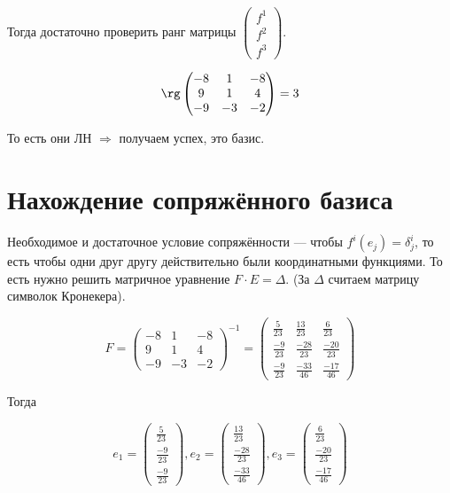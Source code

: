 \documentclass[12pt, a4paper]{article}
\begin{document}
Тогда достаточно проверить ранг матрицы $\begin{pmatrix} f^1 \\ f^2 \\ f^3 \end{pmatrix}$.

\begin{equation}
    \rg \left(\begin{matrix}
        -8 & 1 & -8 \\
        9 & 1 & 4 \\
        -9 & -3 & -2
    \end{matrix}\right) = 3
\end{equation}

То есть они ЛН $\Rightarrow$ получаем успех, это базис.

\section{Нахождение сопряжённого базиса}

Необходимое и достаточное условие сопряжённости — чтобы $f^i(e_j) = \delta^i_j$, то есть чтобы одни друг другу действительно были координатными функциями.
То есть нужно решить матричное уравнение $F \cdot E = \Delta$. (За $\Delta$ считаем матрицу символок Кронекера).

\begin{equation}
    F = \left(\begin{matrix}
        -8 & 1 & -8 \\
        9 & 1 & 4 \\
        -9 & -3 & -2
    \end{matrix}\right)^{-1} = \left(\begin{matrix}
        \frac{5}{23} & \frac{13}{23} & \frac{6}{23} \\
        \frac{-9}{23} & \frac{-28}{23} & \frac{-20}{23} \\
        \frac{-9}{23} & \frac{-33}{46} & \frac{-17}{46}
    \end{matrix}\right)
\end{equation}

Тогда 

\begin{equation}
    e_1 = \begin{pmatrix}
        \frac{5}{23} \\
        \frac{-9}{23} \\
        \frac{-9}{23}
    \end{pmatrix}, e_2 = \begin{pmatrix}
        \frac{13}{23} \\
        \frac{-28}{23} \\
        \frac{-33}{46}
    \end{pmatrix}, e_3 = \begin{pmatrix}
        \frac{6}{23} \\
        \frac{-20}{23} \\
        \frac{-17}{46}
    \end{pmatrix}
\end{equation}
\end{document}
